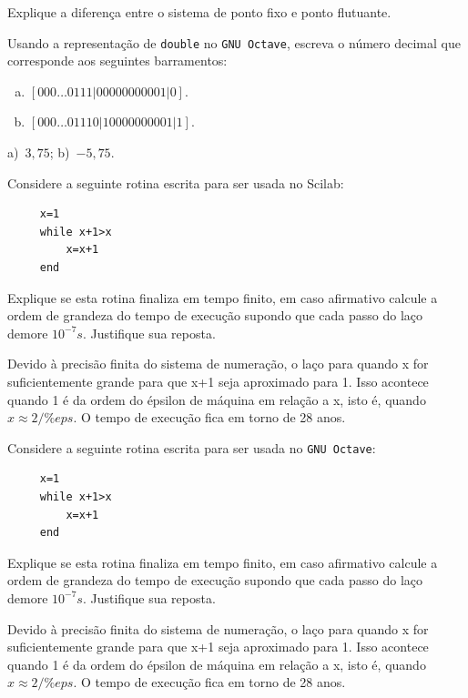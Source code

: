 \begin{exer}
  Explique a diferença entre o sistema de ponto fixo e ponto flutuante.
\end{exer}


\ifisoctave
\begin{exer}
  Usando a representação de \verb+double+ no \verb+GNU Octave+, escreva o número decimal que corresponde aos seguintes barramentos:
  \begin{enumerate}[a)]
  \item $[000\ldots 0111|00000000001|0]$.
  \item $[000\ldots 01110|10000000001|1]$.
  \end{enumerate}
\end{exer}
\begin{resp}
  a)~$3,75$; b)~$-5,75$.
\end{resp}
\fi


\ifisscilab
\begin{exer}Considere a seguinte rotina escrita para ser usada no Scilab:
 \begin{verbatim}
     x=1
     while x+1>x
         x=x+1
     end
 \end{verbatim}
 Explique se esta rotina finaliza em tempo finito, em caso afirmativo calcule a ordem de grandeza do tempo de execução supondo que cada passo do laço demore $10^{-7}s$. Justifique sua reposta.
 \end{exer}
\begin{resp}
 Devido à precisão finita do sistema de numeração, o laço para quando x for suficientemente grande para que x+1 seja aproximado para 1. Isso acontece quando 1 é da ordem do épsilon de máquina em relação a x, isto é, quando $x\approx 2/\%eps$. O tempo de execução fica em torno de 28 anos.
\end{resp}

 \fi



\ifisoctave
\begin{exer}Considere a seguinte rotina escrita para ser usada no \verb+GNU Octave+:
 \begin{verbatim}
     x=1
     while x+1>x
         x=x+1
     end
 \end{verbatim}
 Explique se esta rotina finaliza em tempo finito, em caso afirmativo calcule a ordem de grandeza do tempo de execução supondo que cada passo do laço demore $10^{-7}s$. Justifique sua reposta.
 \end{exer}
\begin{resp}
 Devido à precisão finita do sistema de numeração, o laço para quando x for suficientemente grande para que x+1 seja aproximado para 1. Isso acontece quando 1 é da ordem do épsilon de máquina em relação a x, isto é, quando $x\approx 2/\%eps$. O tempo de execução fica em torno de 28 anos.
\end{resp}
 \fi

